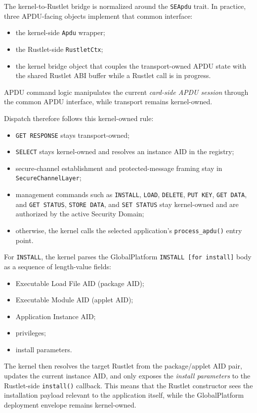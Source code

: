 The kernel-to-Rustlet bridge is normalized around the
\texttt{SEApdu} trait. In practice, three APDU-facing objects implement
that common interface:
\begin{itemize}
\item the kernel-side \texttt{Apdu} wrapper;
\item the Rustlet-side \texttt{RustletCtx};
\item the kernel bridge object that couples the transport-owned APDU
  state with the shared Rustlet ABI buffer while a Rustlet call is in
  progress.
\end{itemize}

APDU command logic manipulates the current \emph{card-side APDU
session} through the common APDU interface, while transport remains
kernel-owned.

Dispatch therefore follows this kernel-owned rule:
\begin{itemize}
\item \texttt{GET RESPONSE} stays transport-owned;
\item \texttt{SELECT} stays kernel-owned and resolves an instance AID in
  the registry;
\item secure-channel establishment and protected-message framing stay in
  \texttt{SecureChannelLayer};
\item management commands such as \texttt{INSTALL}, \texttt{LOAD},
  \texttt{DELETE}, \texttt{PUT KEY}, \texttt{GET DATA}, and
  \texttt{GET STATUS}, \texttt{STORE DATA}, and \texttt{SET STATUS} stay
  kernel-owned and are authorized by the active Security Domain;
\item otherwise, the kernel calls the selected application's
  \texttt{process\_apdu()} entry point.
\end{itemize}

For \texttt{INSTALL}, the kernel parses the
GlobalPlatform \texttt{INSTALL [for install]} body as a sequence of
length-value fields:
\begin{itemize}
\item Executable Load File AID (package AID);
\item Executable Module AID (applet AID);
\item Application Instance AID;
\item privileges;
\item install parameters.
\end{itemize}

The kernel then resolves the target Rustlet from the package/applet AID
pair, updates the current instance AID, and only exposes the
\emph{install parameters} to the Rustlet-side \texttt{install()}
callback. This means that the Rustlet constructor sees the installation
payload relevant to the application itself, while the GlobalPlatform
deployment envelope remains kernel-owned.

